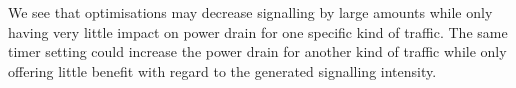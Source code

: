 We see that optimisations may decrease signalling by large amounts while only having very little impact on power drain for one specific kind of traffic.
The same timer setting could increase the power drain for another kind of traffic while only offering little benefit with regard to the generated signalling intensity.
